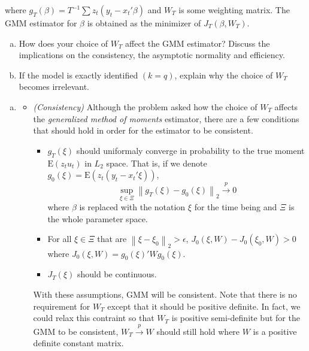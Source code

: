 \documentclass[answers]{exam}
\begin{document}
\begin{questions}
  where $g_{T}\left(\beta\right)=T^{-1}\sum z_{t}\left(y_{t}-x_{t}'\beta\right)$ and $W_{T}$ is some weighting matrix. The GMM estimator for $\beta$ is obtained as the minimizer of $J_{T}\left(\beta,W_{T}\right)$.
  \begin{enumerate}[a)]
    \item How does your choice of $W_{T}$ affect the GMM estimator? Discuss the implications on the consistency, the asymptotic normality and efficiency.
    \item If the model is exactly identified $(k=q)$, explain why the choice of $W_{T}$ becomes irrelevant.
  \end{enumerate}
  \begin{solution}
    \begin{enumerate}[a)]
      \item 
      \begin{itemize}
        \item \emph{(Consistency)} Although the problem asked how the choice of $W_{T}$ affects the \emph{generalized method of moments} estimator, there are a few conditions that should hold in order for the estimator to be consistent.
        \begin{itemize}
          \item $g_{T}\left(\xi\right)$ should uniformaly converge in probability to the true moment $\mathrm{E}\left(z_{t}u_{t}\right)$ in $L_{2}$ space. That is, if we denote $g_{0}\left(\xi\right)=\mathrm{E}\left(z_{t}\left(y_{t}-x_{t}'\xi\right)\right)$,
          \begin{equation}
            \sup_{\xi\in\Xi}\left\|g_{T}\left(\xi\right)-g_{0}\left(\xi\right)\right\|_{2}\xrightarrow{p}0
          \end{equation}
          where $\beta$ is replaced with the notation $\xi$ for the time being and $\Xi$ is the whole parameter space.
          \item For all $\xi\in\Xi$ that are $\left\|\xi-\xi_{0}\right\|_{2}>\epsilon$, $J_{0}\left(\xi,W\right)-J_{0}\left(\xi_{0},W\right)>0$ where $J_{0}\left(\xi,W\right)=g_{0}\left(\xi\right)'Wg_{0}\left(\xi\right)$.
          \item $J_{T}\left(\xi\right)$ should be continuous.
        \end{itemize}
        With these assumptions, GMM will be consistent. Note that there is no requirement for $W_{T}$ except that it should be positive definite. In fact, we could relax this contraint so that $W_{T}$ is positive semi-definite but for the GMM to be consistent, $W_{T}\xrightarrow{p}W$ should still hold where $W$ is a positive definite constant matrix.

\end{itemize}
\end{enumerate}
\end{solution}
\end{questions}
\end{document}
